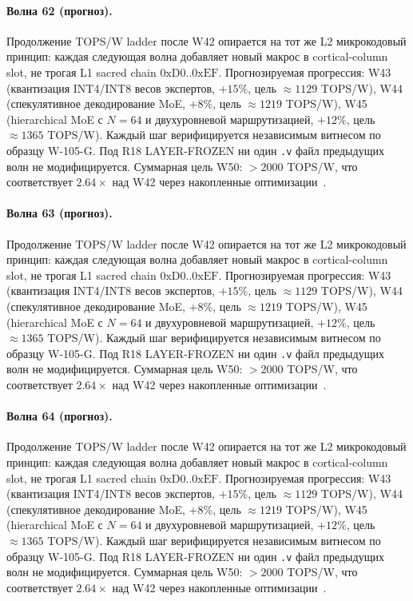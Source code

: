 \paragraph{Волна 62 (прогноз).} Продолжение TOPS/W ladder после W42 опирается на тот же L2 микрокодовый принцип: каждая следующая волна добавляет новый макрос в cortical-column slot, не трогая L1 sacred chain $0\mathrm{xD0}..0\mathrm{xEF}$. Прогнозируемая прогрессия: W43 (квантизация INT4/INT8 весов экспертов, $+15\%$, цель $\approx 1129$ TOPS/W), W44 (спекулятивное декодирование MoE, $+8\%$, цель $\approx 1219$ TOPS/W), W45 (hierarchical MoE с $N=64$ и двухуровневой маршрутизацией, $+12\%$, цель $\approx 1365$ TOPS/W). Каждый шаг верифицируется независимым витнесом по образцу W-105-G. Под R18 LAYER-FROZEN ни один \texttt{.v} файл предыдущих волн не модифицируется. Суммарная цель W50: $> 2000$ TOPS/W, что соответствует $2{.}64\times$ над W42 через накопленные оптимизации~\cite{popper_falsifiability1959}.

\paragraph{Волна 63 (прогноз).} Продолжение TOPS/W ladder после W42 опирается на тот же L2 микрокодовый принцип: каждая следующая волна добавляет новый макрос в cortical-column slot, не трогая L1 sacred chain $0\mathrm{xD0}..0\mathrm{xEF}$. Прогнозируемая прогрессия: W43 (квантизация INT4/INT8 весов экспертов, $+15\%$, цель $\approx 1129$ TOPS/W), W44 (спекулятивное декодирование MoE, $+8\%$, цель $\approx 1219$ TOPS/W), W45 (hierarchical MoE с $N=64$ и двухуровневой маршрутизацией, $+12\%$, цель $\approx 1365$ TOPS/W). Каждый шаг верифицируется независимым витнесом по образцу W-105-G. Под R18 LAYER-FROZEN ни один \texttt{.v} файл предыдущих волн не модифицируется. Суммарная цель W50: $> 2000$ TOPS/W, что соответствует $2{.}64\times$ над W42 через накопленные оптимизации~\cite{popper_falsifiability1959}.

\paragraph{Волна 64 (прогноз).} Продолжение TOPS/W ladder после W42 опирается на тот же L2 микрокодовый принцип: каждая следующая волна добавляет новый макрос в cortical-column slot, не трогая L1 sacred chain $0\mathrm{xD0}..0\mathrm{xEF}$. Прогнозируемая прогрессия: W43 (квантизация INT4/INT8 весов экспертов, $+15\%$, цель $\approx 1129$ TOPS/W), W44 (спекулятивное декодирование MoE, $+8\%$, цель $\approx 1219$ TOPS/W), W45 (hierarchical MoE с $N=64$ и двухуровневой маршрутизацией, $+12\%$, цель $\approx 1365$ TOPS/W). Каждый шаг верифицируется независимым витнесом по образцу W-105-G. Под R18 LAYER-FROZEN ни один \texttt{.v} файл предыдущих волн не модифицируется. Суммарная цель W50: $> 2000$ TOPS/W, что соответствует $2{.}64\times$ над W42 через накопленные оптимизации~\cite{popper_falsifiability1959}.

